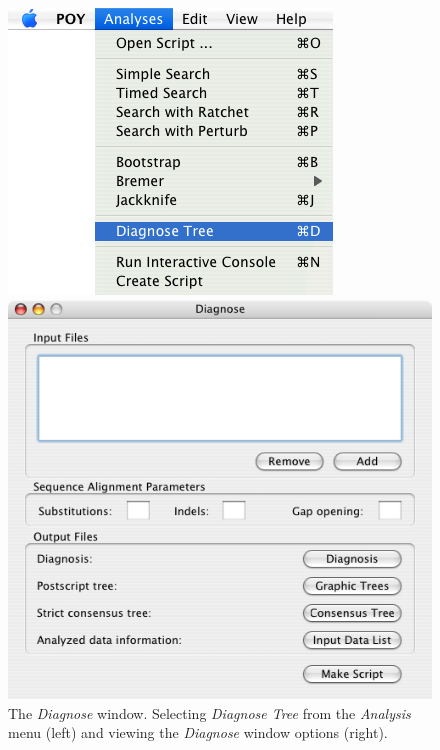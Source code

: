\begin{figure}
\centering
\begin{minipage}[c]{0.48\textwidth}
   		\includegraphics[width=\textwidth]{figures/diagnose_menu.jpg}
\end{minipage}
\quad
\begin{minipage}[c]{0.48\textwidth}
	   	\includegraphics[width=\textwidth]{figures/diagnose_window.jpg}
   	\end{minipage}
\caption{The \emph{Diagnose} window. Selecting \emph{Diagnose Tree} from the \emph{Analysis} menu (left) and viewing the \emph{Diagnose} window options (right).}
\label{fig:diagnosetree}
\end{figure}

